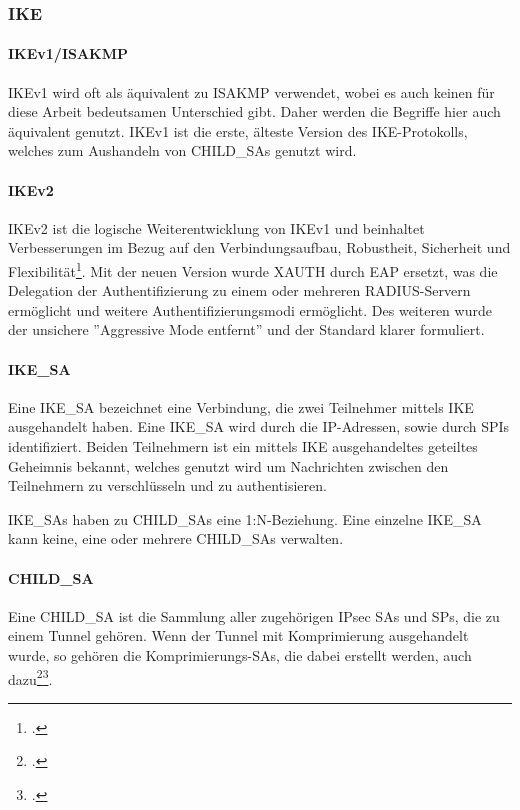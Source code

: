 \subsubsection{IKE}
\paragraph{IKEv1/ISAKMP}
IKEv1 wird oft als äquivalent zu \ac{ISAKMP} verwendet, wobei es auch keinen für diese Arbeit bedeutsamen
Unterschied gibt. Daher werden die Begriffe hier auch äquivalent genutzt.
IKEv1 ist die erste, älteste Version des \ac{IKE}-Protokolls, welches zum Aushandeln
von CHILD\_SAs genutzt wird.
\paragraph{IKEv2}
IKEv2 ist die logische Weiterentwicklung von IKEv1 und beinhaltet Verbesserungen
im Bezug auf den Verbindungsaufbau, Robustheit, Sicherheit und Flexibilität\footcite[136, 137]{charlie_kaufman_rfc_2014}.
Mit der neuen Version wurde XAUTH durch \ac{EAP} ersetzt, was die Delegation der
Authentifizierung zu einem oder mehreren RADIUS-Servern ermöglicht und weitere Authentifizierungsmodi ermöglicht.
Des weiteren wurde der unsichere ''Aggressive Mode entfernt'' und der Standard klarer formuliert.

\paragraph{IKE\_SA}
Eine IKE\_SA bezeichnet eine Verbindung, die zwei Teilnehmer mittels IKE ausgehandelt haben.
Eine IKE\_SA wird durch die \ac{IP}-Adressen, sowie durch \acp{SPI} identifiziert.
Beiden Teilnehmern ist ein mittels \ac{IKE} ausgehandeltes geteiltes Geheimnis bekannt,
welches genutzt wird um Nachrichten zwischen den Teilnehmern zu verschlüsseln und zu authentisieren.

IKE\_SAs haben zu CHILD\_SAs eine 1:N-Beziehung. Eine einzelne IKE\_SA kann keine, eine
oder mehrere CHILD\_SAs verwalten.

\paragraph{CHILD\_SA}
Eine CHILD\_SA ist die Sammlung aller zugehörigen \ac{IPsec} \acp{SA} und \acp{SP},
die zu einem Tunnel gehören. Wenn der Tunnel mit Komprimierung ausgehandelt wurde,
so gehören die Komprimierungs-\acp{SA}, die dabei erstellt werden, auch dazu\footcite[][7]{abraham_shacham_rfc_2001}\footcite[][61]{charlie_kaufman_rfc_2014}.

